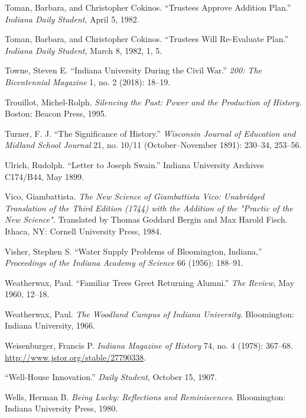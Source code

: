 \documentclass[
  american,
  letterpaper,
]{scrreprt}
\newlength{\cslhangindent}
\newenvironment{CSLReferences}[2] %
 {\begin{list}{}{%
  \setlength{\itemindent}{0pt}
  \setlength{\leftmargin}{0pt}
  \setlength{\parsep}{0pt}
  \ifodd #1
   \setlength{\leftmargin}{\cslhangindent}
   \setlength{\itemindent}{-1\cslhangindent}
  \fi
  \setlength{\itemsep}{#2\baselineskip}}}
 {\end{list}}
\begin{document}
\begin{CSLReferences}{1}{0}
Toman, Barbara, and Christopher Cokinos. {``Trustees Approve Addition
Plan.''} \emph{Indiana Daily Student}, April 5, 1982.

Toman, Barbara, and Christopher Cokinos. {``Trustees Will Re-Evaluate
Plan.''} \emph{Indiana Daily Student}, March 8, 1982, 1, 5.

Towne, Steven E. {``Indiana University During the Civil War.''}
\emph{200: The Bicentennial Magazine} 1, no. 2 (2018): 18--19.

Trouillot, Michel-Rolph. \emph{Silencing the Past: Power and the
Production of History}. Boston: Beacon Press, 1995.

Turner, F. J. {``The Significance of History.''} \emph{Wisconsin Journal
of Education and Midland School Journal} 21, no. 10/11
(October--November 1891): 230--34, 253--56.

Ulrich, Rudolph. {``Letter to Joseph Swain.''} Indiana University
Archives C174/B44, May 1899.

Vico, Giambattista. \emph{The New Science of Giambattista Vico:
Unabridged Translation of the Third Edition (1744) with the Addition of
the "Practic of the New Science"}. Translated by Thomas Goddard Bergin
and Max Harold Fisch. Ithaca, NY: Cornell University Press, 1984.

Visher, Stephen S. {``Water Supply Problems of Bloomington, Indiana,''}
\emph{Proceedings of the Indiana Academy of Science} 66 (1956): 188--91.

Weatherwax, Paul. {``Familiar Trees Greet Returning Alumni.''} \emph{The
Review}, May 1960, 12--18.

Weatherwax, Paul. \emph{The Woodland Campus of Indiana University}.
Bloomington: Indiana University, 1966.

Weisenburger, Francis P. \emph{Indiana Magazine of History} 74, no. 4
(1978): 367--68. \url{http://www.jstor.org/stable/27790338}.

{``Well-House Innovation.''} \emph{Daily Student}, October 15, 1907.

Wells, Herman B. \emph{Being Lucky: Reflections and Reminiscences}.
Bloomington: Indiana University Press, 1980.


\end{CSLReferences}
\end{document}

